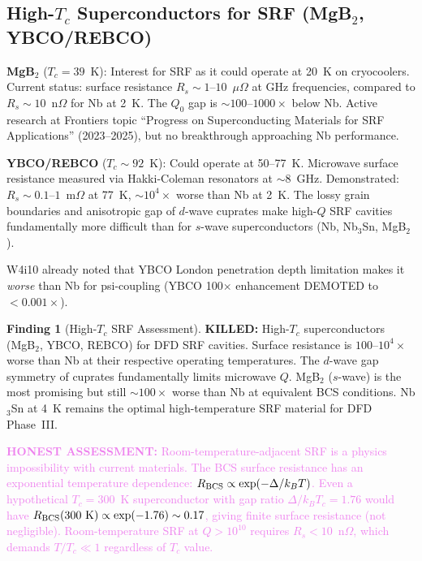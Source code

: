 \documentclass[11pt]{article}
\theoremstyle{definition}
\newtheorem{finding}[theorem]{Finding}
\theoremstyle{remark}
\newcommand{\honest}[1]{\textcolor{violet}{\textbf{HONEST ASSESSMENT:} #1}}
\newcommand{\killed}[1]{\textcolor{red!70!black}{\textbf{KILLED:} #1}}
\begin{document}
\subsection{High-$T_c$ Superconductors for SRF (MgB$_2$, YBCO/REBCO)}
\label{sec:high_tc}

\textbf{MgB$_2$} ($T_c = 39$~K): Interest for SRF as it could
operate at 20~K on cryocoolers. Current status: surface resistance
$R_s \sim 1$--$10$~$\mu\Omega$ at GHz frequencies, compared to
$R_s \sim 10$~n$\Omega$ for Nb at 2~K. The $Q_0$ gap is
$\sim 100$--$1000\times$ below Nb. Active research at Frontiers
topic ``Progress on Superconducting Materials for SRF Applications''
(2023--2025), but no breakthrough approaching Nb performance.

\textbf{YBCO/REBCO} ($T_c \sim 92$~K): Could operate at 50--77~K.
Microwave surface resistance measured via Hakki-Coleman resonators at
$\sim 8$~GHz. Demonstrated: $R_s \sim 0.1$--$1$~m$\Omega$ at 77~K,
$\sim 10^4\times$ worse than Nb at 2~K. The lossy grain boundaries
and anisotropic gap of $d$-wave cuprates make high-$Q$ SRF cavities
fundamentally more difficult than for $s$-wave superconductors
(Nb, Nb$_3$Sn, MgB$_2$).

W4i10 already noted that YBCO London penetration depth limitation
makes it \textit{worse} than Nb for psi-coupling (YBCO 100$\times$
enhancement DEMOTED to $<0.001\times$).

\begin{finding}[High-$T_c$ SRF Assessment]
\label{find:high_tc}
\killed{High-$T_c$ superconductors (MgB$_2$, YBCO, REBCO) for DFD
SRF cavities. Surface resistance is $100$--$10^4\times$ worse than Nb
at their respective operating temperatures. The $d$-wave gap symmetry
of cuprates fundamentally limits microwave $Q$. MgB$_2$ ($s$-wave)
is the most promising but still $\sim 100\times$ worse than Nb at
equivalent BCS conditions. Nb$_3$Sn at 4~K remains the optimal
high-temperature SRF material for DFD Phase~III.}

\honest{Room-temperature-adjacent SRF is a physics impossibility with
current materials. The BCS surface resistance has an exponential
temperature dependence: $R_{\rm BCS} \propto \exp(-\Delta/k_BT)$.
Even a hypothetical $T_c = 300$~K superconductor with gap ratio
$\Delta/k_BT_c = 1.76$ would have $R_{\rm BCS}(300~{\rm K}) \propto
\exp(-1.76) \sim 0.17$, giving finite surface resistance (not
negligible). Room-temperature SRF at $Q > 10^{10}$ requires
$R_s < 10$~n$\Omega$, which demands $T/T_c \ll 1$ regardless of
$T_c$ value.}
\end{finding}
\end{document}
